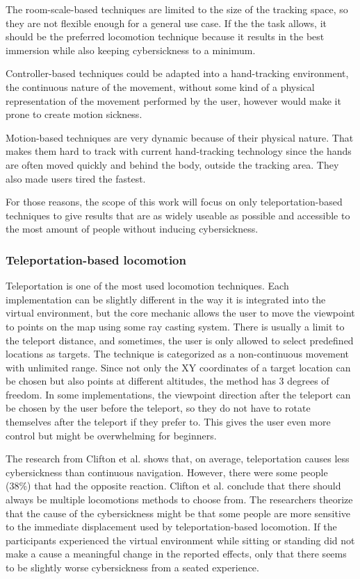 The room-scale-based techniques are limited to the size of the tracking
space, so they are not flexible enough for a general use case. If the
the task allows, it should be the preferred locomotion technique
because it results in the best immersion while also keeping
cybersickness to a minimum.

Controller-based techniques could be adapted into a hand-tracking
environment, the continuous nature of the movement, without some kind of
a physical representation of the movement performed by the user, however
would make it prone to create motion sickness.

Motion-based techniques are very dynamic because of their physical
nature. That makes them hard to track with current hand-tracking
technology since the hands are often moved quickly and behind the body, outside the tracking area. They also made users tired the fastest.

For those reasons, the scope of this work will focus on only
teleportation-based techniques to give results that are as widely useable as
possible and accessible to the most amount of people without inducing
cybersickness.

\subsubsection{Teleportation-based locomotion}\label{teleportation-based-locomotion}

Teleportation is one of the most used locomotion techniques. Each
implementation can be slightly different in the way it is integrated
into the virtual environment, but the core mechanic allows the user to
move the viewpoint to points on the map using some ray casting system.
There is usually a limit to the teleport distance, and sometimes, the user
is only allowed to select predefined locations as targets. The technique
is categorized as a non-continuous movement with unlimited range. Since not
only the XY coordinates of a target location can be chosen but also
points at different altitudes, the method has 3 degrees of freedom. In some implementations, the viewpoint direction after the teleport can be chosen by the user before the teleport, so they do not have to rotate themselves after the teleport if they prefer to. This gives the user even more control but might be overwhelming for beginners.

The research from Clifton et al. \cite{Clifton} shows that, on average, teleportation
causes less cybersickness than continuous navigation. However, there were
some people (38\%) that had the opposite reaction.
Clifton et al. conclude that there should always be multiple locomotions
methods to choose from. The researchers theorize that the cause of the
cybersickness might be that some people are more sensitive to the
immediate displacement used by teleportation-based locomotion. If the
participants experienced the virtual environment while sitting or
standing did not make a cause a meaningful change in the reported
effects, only that there seems to be slightly worse cybersickness from a
seated experience. 

